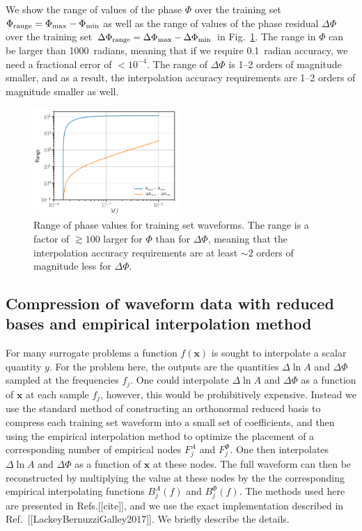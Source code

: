 \documentclass[prd,aps,letter,twocolumn,floatfix,notitlepage]{revtex4-1}
\begin{document}
We show the range of values of the phase $\Phi$ over the training set $\Phi_{\rm range} = \Phi_{\rm max} - \Phi_{\rm min}$ 
as well as the range of values of the phase residual $\Delta\Phi$ over the training set 
$\Delta\Phi_{\rm range} = \Delta\Phi_{\rm max}-\Delta\Phi_{\rm min}$ in Fig.~\ref{fig:phaserange}. 
The range in $\Phi$ can be larger than 1000~radians, meaning
that if we require 0.1~radian accuracy, we need a fractional error of $<10^{-4}$. The range of $\Delta\Phi$ is 1--2 orders 
of magnitude smaller, and as a result, the interpolation accuracy requirements are 1--2 orders of magnitude smaller as well. 

\begin{figure}[htb]
\centering
\includegraphics[width=0.49\textwidth]{phaserange.png}
\caption{Range of phase values for training set waveforms. The range is a factor of $\gtrsim 100$ larger for $\Phi$ than for $\Delta\Phi$, 
meaning that the interpolation accuracy requirements are at least $\sim 2$ orders of magnitude less for $\Delta\Phi$.}
\label{fig:phaserange}
\end{figure}


\subsection{Compression of waveform data with reduced bases and empirical interpolation method}

For many surrogate problems a function $f({\bm x})$ is sought to interpolate a scalar quantity $y$. For the
problem here, the outputs are the quantities $\Delta\ln A$ and $\Delta\Phi$ sampled at the frequencies $f_j$. 
One could interpolate $\Delta\ln A$ and $\Delta\Phi$ as a function of ${\bm x}$ at each sample $f_j$, 
however, this would be prohibitively expensive. Instead we use the standard method of constructing an
orthonormal reduced basis to compress each training set waveform into a small set of coefficients, 
and then using the empirical interpolation method
to optimize the placement of a corresponding number of empirical nodes $F^A_j$ and $F^\Phi_j$. One then interpolates
$\Delta\ln A$ and $\Delta\Phi$ as a function of ${\bm x}$ at these nodes. The full waveform can then be reconstructed by 
multiplying the value at these nodes by the the corresponding empirical interpolating functions $B_j^A(f)$ and $B_j^\Phi(f)$. 
The methods used here are presented in Refs.[[cite]], and we use the exact implementation described in 
Ref.~[[LackeyBernuzziGalley2017]]. We briefly describe the details.
\end{document}
